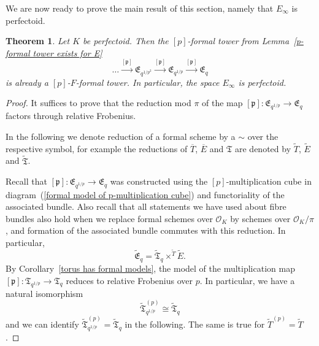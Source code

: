 \documentclass[10pt,oneside]{amsart}
\newtheorem{theorem}{Theorem}[section]
\theoremstyle{definition}
\begin{document}
	We are now ready to prove the main result of this section, namely that $E_\infty$ is perfectoid.
	\begin{theorem}\label{p-F-formal tower exists for E}
		Let $K$ be perfectoid. Then the $[p]$-formal tower from Lemma~\ref{p-formal tower exists for E}
		\[\dots \xrightarrow{[\mathfrak p]} \mathfrak E_{q^{1/p^2}}\xrightarrow{[\mathfrak p]} \mathfrak E_{q^{1/p}}\xrightarrow{[\mathfrak p]} \mathfrak E_q\]
		 is already a $[p]$-$F$-formal tower.
		In particular, the space $E_\infty$ is perfectoid.
	\end{theorem}
	\begin{proof}
	It suffices to prove that the reduction mod $\pi$ of the map $[\mathfrak p]:\mathfrak E_{q^{1/p}}\xrightarrow{} \mathfrak E_q$ factors through relative Frobenius.
	
	In the following we denote reduction of a formal scheme by a $\sim$ over the respective symbol, for example the reductions of $\overline{T}$, $\overline{E}$ and $\mathfrak T$ are denoted by $\tilde{T}$, $\tilde{E}$ and $\tilde{\mathfrak{T}}$.
	
		
	Recall that $[\mathfrak p]:\mathfrak E_{q^{1/p}}\xrightarrow{} \mathfrak E_q$ was constructed using the $[p]$-multiplication cube in diagram~(\ref{formal model of p-multiplication cube}) and functoriality of the associated bundle. 	
	Also recall that all statements we have used about fibre bundles also hold when we replace formal schemes over $\mathcal O_K$ by schemes over $\mathcal O_K/\pi$, and formation of the associated bundle commutes with this reduction. In particular,
	\[\tilde{\mathfrak{E}}_q = \tilde{\mathfrak T}_q\times^{\tilde{T}}\tilde E.\]
	By  Corollary~\ref{torus has formal models}, the model of the multiplication map $[\mathfrak p]:\mathfrak T_{q^{1/p}} \rightarrow \mathfrak T_{q}$ reduces to relative Frobenius over $p$. In particular, we have a natural isomorphism
	\[\tilde{\mathfrak T}_{q^{1/p}}^{(p)} \cong \tilde{\mathfrak T}_{q}\]
	and we can identify $\tilde{\mathfrak T}_{q^{1/p}}^{(p)} = \tilde{\mathfrak T}_{q}$ in the following. The same is true for $\tilde{T}^{(p)} = \tilde{T}$.
	

\end{proof}
\end{document}
